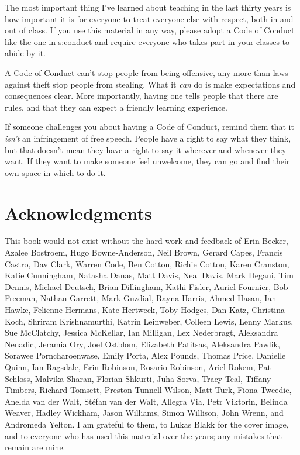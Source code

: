 The most important thing I've learned about teaching in the last thirty
years is how important it is for everyone to treat everyone else with
respect, both in and out of class. If you use this material in any way,
please adopt a Code of Conduct like the one in \protect\hyperlink{APPENDIX}{s:conduct}
and require everyone who takes part in your classes to abide by it.

A Code of Conduct can't stop people from being offensive, any more than
laws against theft stop people from stealing. What it \emph{can} do is make
expectations and consequences clear. More importantly, having one tells
people that there are rules, and that they can expect a friendly
learning experience.

If someone challenges you about having a Code of Conduct, remind them
that it \emph{isn't} an infringement of free speech. People have a right to
say what they think, but that doesn't mean they have a right to say it
wherever and whenever they want. If they want to make someone feel
unwelcome, they can go and find their own space in which to do it.

\section{Acknowledgments}\label{s:intro-acknowledgments}

This book would not exist without the hard work and feedback of
Erin Becker,
Azalee Bostroem,
Hugo Bowne-Anderson,
Neil Brown,
Gerard Capes,
Francis Castro,
Dav Clark,
Warren Code,
Ben Cotton,
Richie Cotton,
Karen Cranston,
Katie Cunningham,
Natasha Danas,
Matt Davis,
Neal Davis,
Mark Degani,
Tim Dennis,
Michael Deutsch,
Brian Dillingham,
Kathi Fisler,
Auriel Fournier,
Bob Freeman,
Nathan Garrett,
Mark Guzdial,
Rayna Harris,
Ahmed Hasan,
Ian Hawke,
Felienne Hermans,
Kate Hertweck,
Toby Hodges,
Dan Katz,
Christina Koch,
Shriram Krishnamurthi,
Katrin Leinweber,
Colleen Lewis,
Lenny Markus,
Sue McClatchy,
Jessica McKellar,
Ian Milligan,
Lex Nederbragt,
Aleksandra Nenadic,
Jeramia Ory,
Joel Ostblom,
Elizabeth Patitsas,
Aleksandra Pawlik,
Sorawee Porncharoenwase,
Emily Porta,
Alex Pounds,
Thomas Price,
Danielle Quinn,
Ian Ragsdale,
Erin Robinson,
Rosario Robinson,
Ariel Rokem,
Pat Schloss,
Malvika Sharan,
Florian Shkurti,
Juha Sorva,
Tracy Teal,
Tiffany Timbers,
Richard Tomsett,
Preston Tunnell Wilson,
Matt Turk,
Fiona Tweedie,
Anelda van der Walt,
Stéfan van der Walt,
Allegra Via,
Petr Viktorin,
Belinda Weaver,
Hadley Wickham,
Jason Williams,
Simon Willison,
John Wrenn,
and Andromeda Yelton.
I am grateful to them, to Lukas Blakk for the cover image, and to
everyone who has used this material over the years; any mistakes that
remain are mine.

